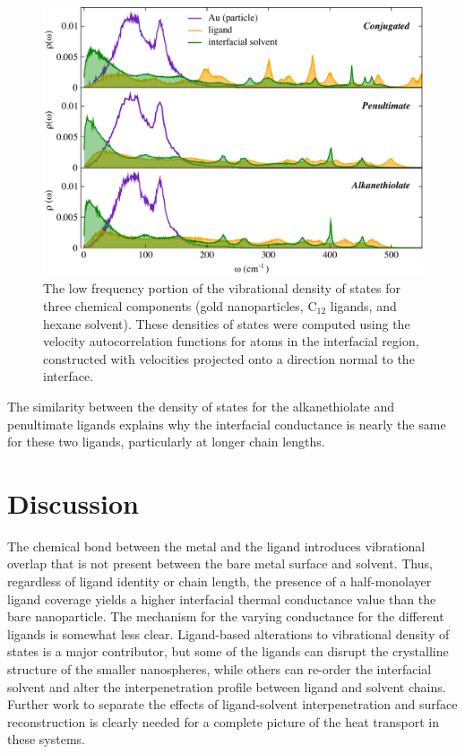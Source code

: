 \begin{figure}
  \includegraphics[width=\linewidth]{figures/rho_omega_12}
  \caption{The low frequency portion of the vibrational density of
    states for three chemical components (gold nanoparticles, C$_{12}$
    ligands, and hexane solvent). These densities of states were
    computed using the velocity autocorrelation functions for atoms in
    the interfacial region, constructed with velocities projected onto
    a direction normal to the interface.}
  \label{fig:vdos}
\end{figure}

The similarity between the density of states for the alkanethiolate
and penultimate ligands explains why the interfacial
conductance is nearly the same for these two ligands, particularly at
longer chain lengths.

\section{Discussion}

The chemical bond between the metal and the ligand introduces
vibrational overlap that is not present between the bare metal surface
and solvent. Thus, regardless of ligand identity or chain length, the
presence of a half-monolayer ligand coverage yields a higher
interfacial thermal conductance value than the bare nanoparticle.  The
mechanism for the varying conductance for the different ligands is
somewhat less clear.  Ligand-based alterations to vibrational density
of states is a major contributor, but some of the ligands can disrupt
the crystalline structure of the smaller nanospheres, while others can
re-order the interfacial solvent and alter the interpenetration
profile between ligand and solvent chains. Further work to separate
the effects of ligand-solvent interpenetration and surface
reconstruction is clearly needed for a complete picture of the heat
transport in these systems.

